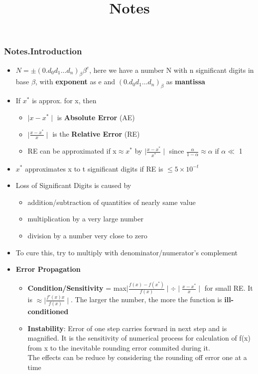 \documentclass[12pt,letterpaper]{article}
\title{Notes}
\newcommand\asgnname{Notes}         %
\newenvironment{answer}[1]{
  \subsubsection*{%
  \asgnname.#1}
}{\newpage}
\begin{document}
\begin{answer}{Introduction}
    \begin{itemize}
        \item $ N = \pm (0.d_0 d_1 \ldots d_n)_\beta \beta^e$, here we have a number N with n significant digits in base $\beta$, with \textbf{exponent} as e and $(0.d_0 d_1 \ldots d_n)_\beta$ as \textbf{mantissa}
        \item If $x^*$ is approx. for x, then 
        \begin{itemize}
            \item $\mid x-x^* \mid$ is \textbf{Absolute Error} (AE)
            \item $\mid \frac{x-x^*}{x} \mid$ is the \textbf{Relative Error} (RE)
            \item RE can be approximated if x$\approx x^*$ by $\mid \frac{x-x^*}{x^*} \mid$ since $\frac{\alpha}{1-\alpha} \approx \alpha$ if $\alpha \ll$ 1
        \end{itemize}
        \item $x^*$ approximates x to t significant digits if RE is $\le 5 \times 10^{-t}$
        \item Loss of Significant Digits is caused by 
        \begin{itemize}
            \item addition/subtraction of quantities of nearly same value
            \item multiplication by a very large number
            \item division by a number very close to zero
        \end{itemize}
        \item To cure this, try to multiply with denominator/numerator's complement
        \item \textbf{Error Propagation}
        \begin{itemize}
            \item \textbf{Condition/Sensitivity} = max{$\mid \frac{f(x)-f(x^*)}{f(x)}\mid \div \mid \frac{x-x^*}{x} \mid$} for small RE. It is $\approx \mid \frac{f'(x)x}{f(x)}\mid$. The larger the number, the more the function is \textbf{ill-conditioned}
            \item \textbf{Instability}: Error of one step carries forward in next step and is magnified. It is the sensitivity of numerical process for calculation of f(x) from x to the inevitable rounding error commited during it.\\
            The effects can be reduce by considering the rounding off error one at a time

\end{itemize}
\end{itemize}
\end{answer}
\end{document}
